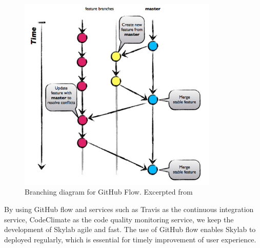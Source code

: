 \begin{figure}[h]
  \centering
  \includegraphics[width=0.85\textwidth]{Images/Github_Flow_Branching_Model.png}
  \caption{Branching diagram for GitHub Flow. Excerpted from \cite{citation8}}
  \label{fig:GithubFlow}
\end{figure}

By using GitHub flow and services such as Travis as the continuous integration service, CodeClimate as the code quality monitoring service, we keep the development of Skylab agile and fast. The use of GitHub flow enables Skylab to deployed regularly, which is essential for timely improvement of user experience\cite{citation9}.
